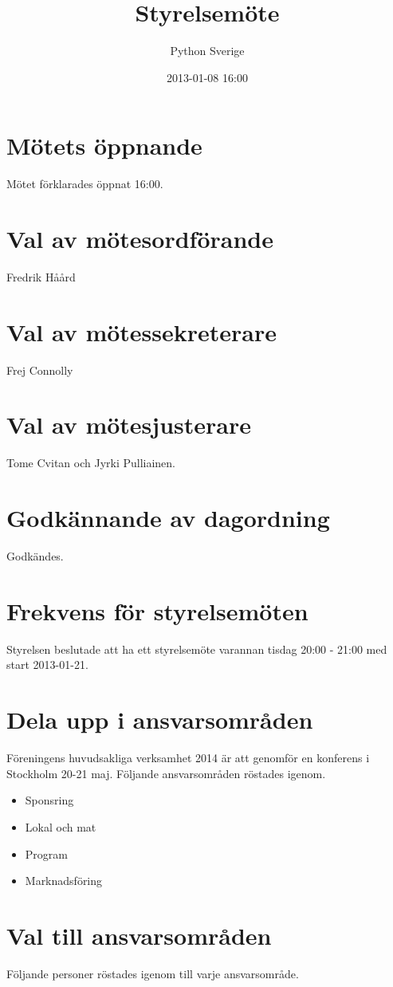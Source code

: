 \documentclass[11pt, a4paper]{article}
\title{Styrelsemöte}
\author{Python Sverige}
\date{2013-01-08 16:00}
\begin{document}
\maketitle

\section{Mötets öppnande}
Mötet förklarades öppnat 16:00.

\section{Val av mötesordförande}
Fredrik Håård

\section{Val av mötessekreterare}
Frej Connolly

\section{Val av mötesjusterare}
Tome Cvitan och Jyrki Pulliainen.

\section{Godkännande av dagordning}
Godkändes.

\section{Frekvens för styrelsemöten}
Styrelsen beslutade att ha ett styrelsemöte varannan tisdag 20:00 - 21:00 med
start 2013-01-21.

\section{Dela upp i ansvarsområden}
Föreningens huvudsakliga verksamhet 2014 är att genomför en konferens i
Stockholm 20-21 maj. Följande ansvarsområden röstades igenom.

\begin{itemize}
    \item Sponsring
    \item Lokal och mat
    \item Program
    \item Marknadsföring
\end{itemize}

\section{Val till ansvarsområden}
Följande personer röstades igenom till varje ansvarsområde.
\end{document}
